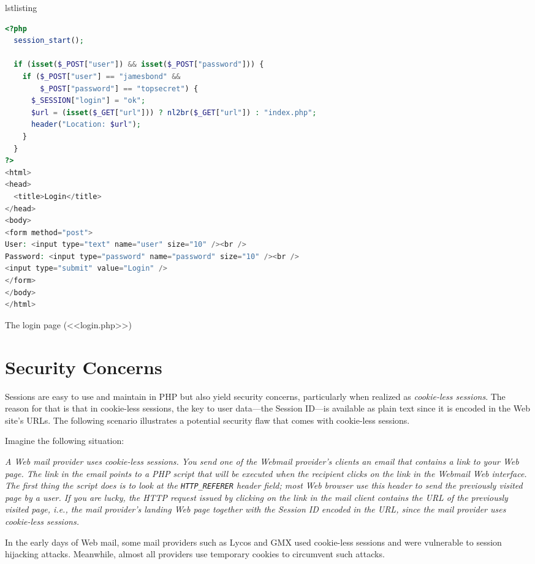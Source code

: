 \documentclass[a4paper, justified, notoc]{tufte-handout} %
\makeatletter
\newenvironment{listing}[1][htbp]
  {\ifvmode\else\unskip\fi\begin{@tufte@float}[#1]{lstlisting}{}}
  {\end{@tufte@float} } %
\makeatother
\begin{document}
\begin{listing}
\begin{lstlisting}[language=PHP]
<?php
  session_start();

  if (isset($_POST["user"]) && isset($_POST["password"])) {
    if ($_POST["user"] == "jamesbond" && 
        $_POST["password"] == "topsecret") {
      $_SESSION["login"] = "ok";
      $url = (isset($_GET["url"])) ? nl2br($_GET["url"]) : "index.php";
      header("Location: $url");
    }
  }
?>
<html>
<head>
  <title>Login</title>
</head>
<body>
<form method="post">
User: <input type="text" name="user" size="10" /><br />
Password: <input type="password" name="password" size="10" /><br />
<input type="submit" value="Login" />
</form>
</body>
</html>
\end{lstlisting}
	\caption{The login page (<<login.php>>)}
	\label{login_page}
\end{listing}


\section{Security Concerns} %
\label{sec:security_concerns}
Sessions are easy to use and maintain in PHP but also yield security concerns, particularly when realized as \emph{cookie-less sessions}. 
The reason for that is that in cookie-less sessions, the key to user data---the Session ID---is available as plain text since it is encoded in the Web site's URLs.
The following scenario illustrates a potential security flaw that comes with cookie-less sessions.

Imagine the following situation:

\emph{A Web mail provider uses cookie-less sessions.
You send one of the Webmail provider's clients an email that contains a link to your Web page.
The link in the email points to a PHP script that will be executed when the recipient clicks on the link in the Webmail Web interface.
The first thing the script does is to look at the \texttt{HTTP\_REFERER} header field; 
most Web browser use this header to send the previously visited page by a user. 
If you are lucky, the HTTP request issued by clicking on the link in the mail client contains the URL of the previously visited page, i.e., the mail provider's landing Web page together with the Session ID encoded in the URL, since the mail provider uses cookie-less sessions. }

In the early days of Web mail, some mail providers such as Lycos and GMX used cookie-less sessions and were vulnerable to session hijacking attacks. Meanwhile, almost all providers use temporary cookies to circumvent such attacks. 
\end{document}
